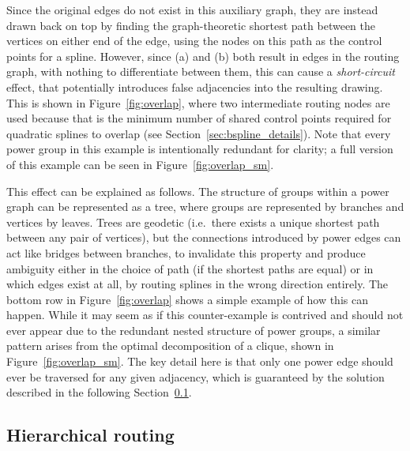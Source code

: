 Since the original edges do not exist in this auxiliary graph, they are instead drawn back on top by finding the graph-theoretic shortest path between the vertices on either end of the edge, using the nodes on this path as the control points for a spline.
However, since (a) and (b) both result in edges in the routing graph, with nothing to differentiate between them, this can cause a \emph{short-circuit} effect, that potentially introduces false adjacencies into the resulting drawing.
This is shown in Figure~\ref{fig:overlap}, where two intermediate routing nodes are used because that is the minimum number of shared control points required for quadratic splines to overlap (see Section~\ref{sec:bspline_details}).
Note that every power group in this example is intentionally redundant for clarity; a full version of this example can be seen in Figure~\ref{fig:overlap_sm}.

This effect can be explained as follows. The structure of groups within a power graph can be represented as a tree, where groups are represented by branches and vertices by leaves.
Trees are geodetic (i.e.\ there exists a unique shortest path between any pair of vertices), but the connections introduced by power edges can act like bridges between branches, to invalidate this property and produce ambiguity either in the choice of path (if the shortest paths are equal) or in which edges exist at all, by routing splines in the wrong direction entirely.
The bottom row in Figure~\ref{fig:overlap} shows a simple example of how this can happen. While it may seem as if this counter-example is contrived and should not ever appear due to the redundant nested structure of power groups, a similar pattern arises from the optimal decomposition of a clique, shown in Figure~\ref{fig:overlap_sm}.
The key detail here is that only one power edge should ever be traversed for any given adjacency, which is guaranteed by the solution described in the following Section~\ref{sec:hierarchical_routing}.

\subsection{Hierarchical routing}
\label{sec:hierarchical_routing}

